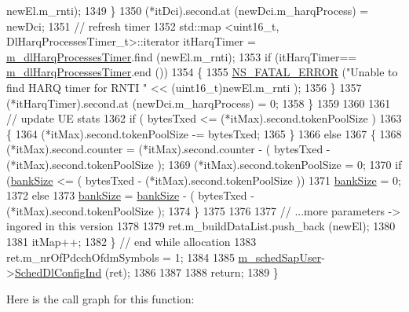 \begin{DoxyCode}
      newEl.m\_rnti);
1349             \}
1350           (*itDci).second.at (newDci.m\_harqProcess) = newDci;
1351           \textcolor{comment}{// refresh timer}
1352           std::map <uint16\_t, DlHarqProcessesTimer\_t>::iterator itHarqTimer =  
      \hyperlink{classns3_1_1TdTbfqFfMacScheduler_a772806188cbe19e816a9eab534733ee1}{m\_dlHarqProcessesTimer}.find (newEl.m\_rnti);
1353           \textcolor{keywordflow}{if} (itHarqTimer== \hyperlink{classns3_1_1TdTbfqFfMacScheduler_a772806188cbe19e816a9eab534733ee1}{m\_dlHarqProcessesTimer}.end ())
1354             \{
1355               \hyperlink{group__fatal_ga5131d5e3f75d7d4cbfd706ac456fdc85}{NS\_FATAL\_ERROR} (\textcolor{stringliteral}{"Unable to find HARQ timer for RNTI "} << (uint16\_t)newEl.m\_rnti
      );
1356             \}
1357           (*itHarqTimer).second.at (newDci.m\_harqProcess) = 0;
1358         \}
1359 
1360 
1361         \textcolor{comment}{// update UE stats}
1362       \textcolor{keywordflow}{if} ( bytesTxed <= (*itMax).second.tokenPoolSize )
1363         \{
1364           (*itMax).second.tokenPoolSize -= bytesTxed;
1365         \}
1366       \textcolor{keywordflow}{else}
1367         \{
1368           (*itMax).second.counter = (*itMax).second.counter - ( bytesTxed -  (*itMax).second.tokenPoolSize 
      );
1369           (*itMax).second.tokenPoolSize = 0;
1370           \textcolor{keywordflow}{if} (\hyperlink{classns3_1_1TdTbfqFfMacScheduler_af215332201b187b2699413c222d0c88d}{bankSize} <= ( bytesTxed -  (*itMax).second.tokenPoolSize ))
1371             \hyperlink{classns3_1_1TdTbfqFfMacScheduler_af215332201b187b2699413c222d0c88d}{bankSize} = 0;
1372           \textcolor{keywordflow}{else} 
1373             \hyperlink{classns3_1_1TdTbfqFfMacScheduler_af215332201b187b2699413c222d0c88d}{bankSize} = \hyperlink{classns3_1_1TdTbfqFfMacScheduler_af215332201b187b2699413c222d0c88d}{bankSize} - ( bytesTxed -  (*itMax).second.tokenPoolSize );
1374         \}
1375 
1376 
1377       \textcolor{comment}{// ...more parameters -> ingored in this version}
1378 
1379       ret.m\_buildDataList.push\_back (newEl);
1380 
1381       itMap++;
1382     \} \textcolor{comment}{// end while allocation}
1383   ret.m\_nrOfPdcchOfdmSymbols = 1;   
1384 
1385   \hyperlink{classns3_1_1TdTbfqFfMacScheduler_a8f5689c5d8af1b40e97dacfce14f605a}{m\_schedSapUser}->\hyperlink{classns3_1_1FfMacSchedSapUser_a28f8484af5a32a45ee6c0e51770d83f7}{SchedDlConfigInd} (ret);
1386 
1387 
1388   \textcolor{keywordflow}{return};
1389 \}
\end{DoxyCode}


Here is the call graph for this function\+:




